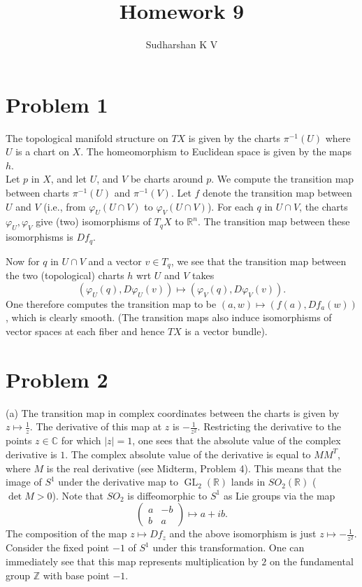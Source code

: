 \documentclass{amsart}
\title{Homework 9}
\author{Sudharshan K V}
\numberwithin{equation}{section}
\theoremstyle{plain}
\theoremstyle{definition}
\theoremstyle{remark}
\newcommand{\Z}{\mathbb{Z}}
\renewcommand{\_}[2]{\underbrace{#1}_{#2}}
\renewcommand{\^}[2]{\overbrace{#1}_{#2}}
\newcommand{\R}{\mathbb{R}}
\newcommand{\C}{\mathbb{C}}
\newcommand{\GL}{\operatorname{GL}}
\begin{document}
\maketitle

\section*{Problem 1}
The topological manifold structure on $TX$ is given by the charts $\pi^{-1}(U)$ where $U$ is a chart on $X$. The homeomorphism to Euclidean space is given by the maps $h$. \\

Let $p$ in $X$, and let $U$, and $V$ be charts around $p$. We compute the transition map between charts $\pi^{-1}(U)$ and $\pi^{-1}(V)$. Let $f$ denote the transition map between $U$ and $V$ (i.e., from $\varphi_U(U\cap V)$ to $\varphi_V(U\cap V)$). For each $q$ in $U \cap V$, the charts $\varphi_U, \varphi_V$ give (two) isomorphisms of $T_qX$ to $\R^n$. The transition map between these isomorphisms is $Df_q$.

Now for $q$ in $U \cap V$ and a vector $v \in T_q$, we see that the transition map between the two (topological) charts $h$ wrt $U$ and $V$ takes \[(\varphi_U(q), D\varphi_U(v)) \mapsto (\varphi_V(q), D\varphi_V(v)).\] One therefore computes the transition map to be $(a, w) \mapsto (f(a), Df_a(w))$, which is clearly smooth. (The transition maps also induce isomorphisms of vector spaces at each fiber and hence $TX$ is a vector bundle).

\section*{Problem 2}
(a) The transition map in complex coordinates between the charts is given by $z \mapsto \frac1z$. The derivative of this map at $z$ is $-\frac1{z^2}$. Restricting the derivative to the points $z \in \C$ for which $|z| = 1$, one sees that the absolute value of the complex derivative is $1$. The complex absolute value of the derivative is equal to $MM^T$, where $M$ is the real derivative (see Midterm, Problem 4). This means that the image of $S^1$ under the derivative map to $\GL_2(\R)$ lands in $SO_2(\R)$ ($\det M>0$). Note that $SO_2$ is diffeomorphic to $S^1$ as Lie groups via the map \[
  \begin{pmatrix}
    a & -b\\
    b & a
  \end{pmatrix} \mapsto a+ib.\]
The composition of the map $z \mapsto Df_z$ and the above isomorphism is just $z \mapsto -\frac1{z^2}$. Consider the fixed point $-1$ of $S^1$ under this transformation. One can immediately see that this map represents multiplication by $2$ on the fundamental group $\Z$ with base point $-1$. \\
\end{document}
